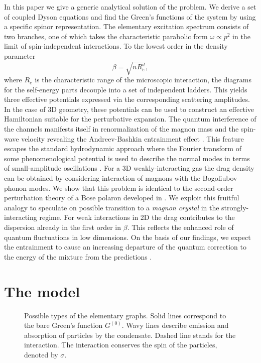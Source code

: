 \documentclass[reprint,superscriptaddress,showpacs,nofootinbib,aps,pra]{revtex4-1}
\begin{document}
In this paper we give a generic analytical solution of the problem. We derive a set of coupled Dyson equations and find the Green's functions of the system by using a specific spinor representation. The elementary excitation spectrum consists of two branches, one of which takes the characteristic parabolic form $\omega\propto p^2$ in the limit of spin-independent interactions. To the lowest order in the density parameter 
\begin{equation}
\beta=\sqrt{nR_e^d},
\end{equation}
where $R_e$ is the characteristic range of the microscopic interaction, the diagrams for the self-energy parts decouple into a set of independent ladders. This yields three effective potentials expressed via the corresponding scattering amplitudes. In the case of 3D geometry, these potentials can be used to construct an effective Hamiltonian suitable for the perturbative expansion. The quantum interference of the channels manifests itself in renormalization of the magnon mass and the spin-wave velocity revealing the Andreev-Bashkin entrainment effect \cite{AB}. This feature escapes the standard hydrodynamic approach where the Fourier transform of some phenomenological potential is used to describe the normal modes in terms of small-amplitude oscillations \cite{ResonantPairing, Petrov2015, Petrov2016, Goldstein, Berman, Alexandrov, Eckardt}. For a 3D weakly-interacting gas the drag density can be obtained by considering interaction of magnons with the Bogoliubov phonon modes. We show that this problem is identical to the second-order perturbation theory of a Bose polaron developed in \cite{Christensen}. We exploit this fruitful analogy to speculate on possible transition to a \textit{magnon crystal} in the strongly-interacting regime. For weak interactions in 2D the drag contributes to the dispersion already in the first order in $\beta$. This reflects the enhanced role of quantum fluctuations in low dimensions. On the basis of our findings, we expect the entrainment to cause an increasing departure of the quantum correction to the energy of the mixture from the predictions \cite{Petrov2015, Petrov2016}.   

\section{The model}
\begin{figure*}[t]
\caption{Possible types of the elementary graphs. Solid lines correspond to the bare Green's function $G^{(0)}$. Wavy lines describe emission and absorption of particles by the condensate. Dashed line stands for the interaction. The interaction conserves the spin of the particles, denoted by $\sigma$.}
\label{Elementars}
\end{figure*}
\end{document}
